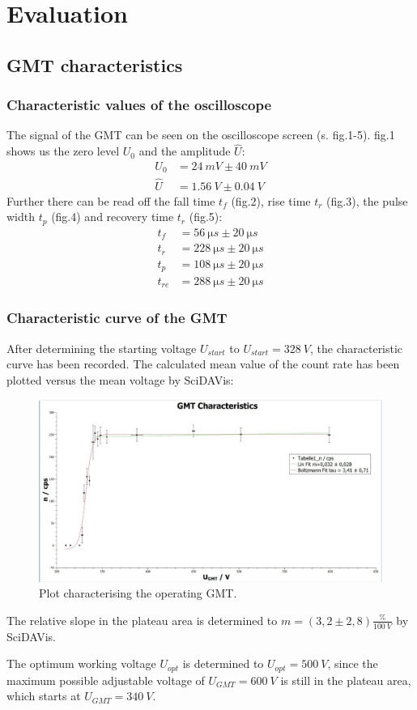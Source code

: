 \chapter{Evaluation}
%
\section{GMT characteristics}
%
\subsection{Characteristic values of the oscilloscope}
%
The signal of the GMT can be seen on the oscilloscope screen (s. fig.1-5). fig.1 shows us the zero level \(U_{0}\) and
the amplitude \(\hat{U}\):
%
\begin{align}
U_{0}   &=  \SI{24}{mV} \pm \SI{40}{mV} \\
\hat{U} &=  \SI{1,56}{V} \pm \SI{0,04}{V}
\end{align}
%
Further there can be read off the fall time \(t_{f}\) (fig.2), rise time \(t_{r}\) (fig.3), the pulse width \(t_{p}\)
(fig.4) and recovery time \(t_{r}\) (fig.5):
\begin{align}
t_{f}   &=  \SI{56}{\micro s} \pm \SI{20}{\micro s} \\
t_{r}   &=  \SI{228}{\micro s} \pm \SI{20}{\micro s} \\
t_{p}   &=  \SI{108}{\micro s} \pm \SI{20}{\micro s} \\
t_{re}  &=  \SI{288}{\micro s} \pm \SI{20}{\micro s}
\end{align}
%
\subsection{Characteristic curve of the GMT}
%
After determining the starting voltage \(U_{start}\) to \(U_{start}=\SI{328}{V}\), the characteristic curve has been
recorded. The calculated mean value
of the count rate has been plotted versus the mean voltage by SciDAVis:\par
\begin{figure}[H]
 \centering
 \includegraphics[width=.8\textwidth]{scidavis/Fig.6_GMT-characteristics.jpg}
 \caption[GMT characteristic]{Plot characterising the operating GMT.}
 \label{fig:gmtCharacteristics}
\end{figure}
The relative slope in the plateau area is determined to \(m=(3,2 \pm 2,8) \frac{\%}{\SI{100}{V}}\) by SciDAVis.\par
The optimum working voltage \(U_{opt}\) is determined to \(U_{opt}=\SI{500}{V}\), since the maximum possible adjustable
voltage of \(U_{GMT}=\SI{600}{V}\) is still in the plateau area, which starts at \(U_{GMT}=\SI{340}{V}\).
%
